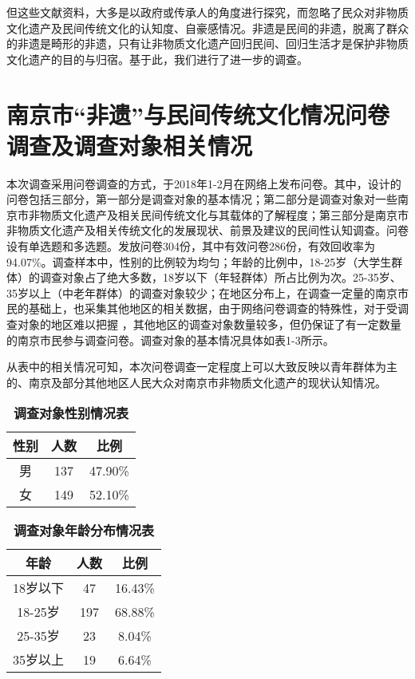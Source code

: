 \documentclass[12pt]{article}%
\begin{document}
但这些文献资料，大多是以政府或传承人的角度进行探究，而忽略了民众对非物质文化遗产及民间传统文化的认知度、自豪感情况。非遗是民间的非遗，脱离了群众的非遗是畸形的非遗，只有让非物质文化遗产回归民间、回归生活才是保护非物质文化遗产的目的与归宿。基于此，我们进行了进一步的调查。


\section{南京市“非遗”与民间传统文化情况问卷调查及调查对象相关情况}

本次调查采用问卷调查的方式，于2018年1-2月在网络上发布问卷。其中，设计的问卷包括三部分，第一部分是调查对象的基本情况；第二部分是调查对象对一些南京市非物质文化遗产及相关民间传统文化与其载体的了解程度；第三部分是南京市非物质文化遗产及相关传统文化的发展现状、前景及建议的民间性认知调查。问卷设有单选题和多选题。发放问卷304份，其中有效问卷286份，有效回收率为94.07\%。调查样本中，性别的比例较为均匀；年龄的比例中，18-25岁（大学生群体）的调查对象占了绝大多数，18岁以下（年轻群体）所占比例为次。25-35岁、35岁以上（中老年群体）的调查对象较少；在地区分布上，在调查一定量的南京市民的基础上，也采集其他地区的相关数据，由于网络问卷调查的特殊性，对于受调查对象的地区难以把握
，其他地区的调查对象数量较多，但仍保证了有一定数量的南京市民参与调查问卷。调查对象的基本情况具体如表1-3所示。

从表中的相关情况可知，本次问卷调查一定程度上可以大致反映以青年群体为主的、南京及部分其他地区人民大众对南京市非物质文化遗产的现状认知情况。

\begin{table}[htbp]
  \centering
   \caption{\bf{调查对象性别情况表}}
    \begin{tabular}{ccc}
    \hline
    性别    & 人数    & 比例 \\
    \hline
    男     & 137   & 47.90\% \\
    女     & 149   & 52.10\% \\
    \hline
    \end{tabular}
    \end{table}%

\begin{table}[htbp]
\centering
  \caption{\bf{调查对象年龄分布情况表}}
\begin{tabular}{ccc}
\hline
年龄    & 人数    & 比例 \\
\hline
18岁以下 & 47    & 16.43\% \\
18-25岁 & 197   & 68.88\% \\
25-35岁 & 23    & 8.04\% \\
35岁以上 & 19    & 6.64\% \\
\hline
\end{tabular}%
\end{table}%
\end{document}
